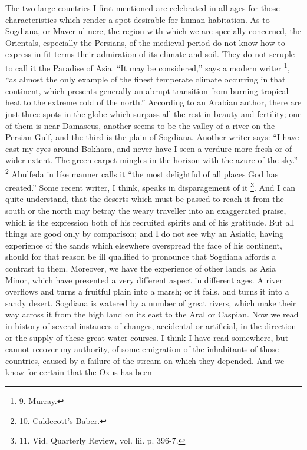 The two large countries I
first mentioned are celebrated in all ages for those characteristics
which render a spot desirable for human habitation. As to Sogdiana, or
Maver-ul-nere, the region with which we are specially concerned, the
Orientals, especially the Persians, of the medieval period do not know
how to express in fit terms their admiration of its climate and soil.
They do not scruple to call it the Paradise of Asia. ``It may be
considered,'' says a modern writer \footnote{9.
Murray.}, ``as almost the only example of the finest temperate climate
occurring in that continent, which presents generally an abrupt
transition from burning tropical heat to the extreme cold of the
north.'' According to an Arabian author, there are just three spots in
the globe which surpass all the rest in beauty and fertility; one of
them is near Damascus, another seems to be the valley of a river on
the Persian Gulf, and the third is the plain of Sogdiana. Another
writer says: ``I have cast my eyes around Bokhara, and never have I
seen a verdure more fresh or of wider extent. The green carpet mingles
in the horizon with the azure of the sky.'' \footnote{10.
Caldecott's Baber.} Abulfeda in like manner calls it ``the most delightful of all
places God has created.'' Some recent writer, I think, speaks in
disparagement of it \footnote{11.
Vid. Quarterly Review, vol. lii. p. 396-7.}.
And I can quite understand, that the deserts which must be passed to
reach it from the south or the north may betray the weary traveller
into an exaggerated praise, which is the expression both of his
recruited spirits and of his gratitude. But all things are good only
by comparison; and I do not see why an Asiatic, having experience of
the sands which elsewhere overspread the face of his continent, should
for that reason be ill qualified to pronounce that Sogdiana affords a
contrast to them. Moreover, we have the experience of other lands, as
Asia Minor, which have presented a very different aspect in different
ages. A river overflows and turns a fruitful plain into a marsh; or it
fails, and turns it into a sandy desert. Sogdiana is watered by a
number of great rivers, which make their way across it from the high
land on its east to the Aral or Caspian. Now we read in history of
several instances of changes, accidental or artificial, in the
direction or the supply of these great water-courses. I think I have
read somewhere, but cannot recover my authority, of some emigration of
the inhabitants of those countries, caused by a failure of the stream
on which they depended. And we know for certain that the Oxus has been
